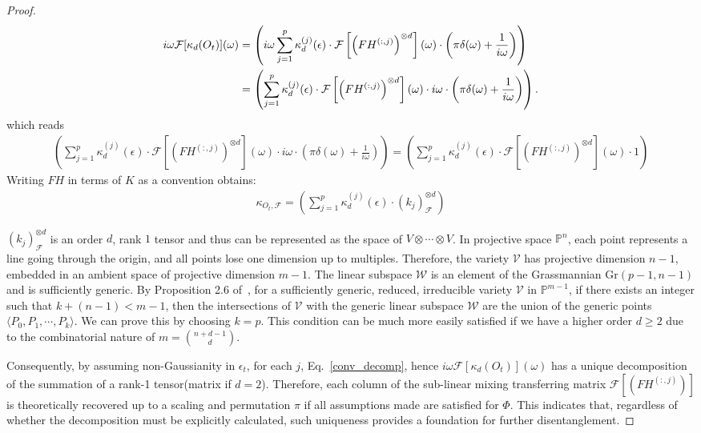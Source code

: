 \documentclass[10pt]{article}
\numberwithin{figure}{section}
\begin{document}
\begin{proof}
\begin{align}
     i\omega \mathcal{F}[\kappa_d(O_t)](\omega) 
&= \left( i\omega\sum_{j=1}^p \kappa_d^{(j)}(\epsilon) \cdot \mathcal{F}\left[ \left( F H^{(:,j)} \right)^{\otimes d} \right](\omega) \cdot \left( \pi \delta(\omega) + \frac{1}{i \omega} \right)\right) \notag\\
&= \left( \sum_{j=1}^p \kappa_d^{(j)}(\epsilon) \cdot \mathcal{F}\left[ \left( F H^{(:,j)} \right)^{\otimes d} \right](\omega) \cdot i\omega\cdot \left( \pi \delta(\omega) + \frac{1}{i \omega} \right)\right).\notag
\end{align}
which reads
\begin{align}
    \left( \sum_{j=1}^p \kappa_d^{(j)}(\epsilon) \cdot \mathcal{F}\left[ \left( F H^{(:,j)} \right)^{\otimes d} \right](\omega) \cdot i\omega\cdot \left( \pi \delta(\omega) + \frac{1}{i \omega} \right)\right)=\left( \sum_{j=1}^p \kappa_d^{(j)}(\epsilon) \cdot \mathcal{F}\left[ \left( F H^{(:,j)} \right)^{\otimes d} \right](\omega)\cdot 1\right)\label{conv_decomp}
\end{align}
Writing $FH$ in terms of $K$ as a convention obtains:
\begin{align*}
    \kappa_{O_t,\mathcal{F}} = \left( \sum_{j=1}^p \kappa_d^{(j)}(\epsilon) \cdot  \left( k_j \right)_{\mathcal{F}}^{\otimes d}\right)
\end{align*}

$\left( k_j \right)_{\mathcal{F}}^{\otimes d}$ is an order $d$, rank $1$ tensor and thus can be represented as the space of $V\otimes\cdots\otimes V$. 
In projective space $\mathbb{P}^n$, each point represents a line going through the origin, and all points lose one dimension up to multiples. Therefore, the variety $\mathcal{V}$ has projective dimension $n-1$, embedded in an ambient space of projective dimension $m-1$.   The linear subspace $\mathcal{W}$ is an element of the Grassmannian $\mathrm{Gr}(p-1,n-1)$ and is sufficiently generic.  By Proposition 2.6 of~\citep{chiantini2002weakly}, for a sufficiently generic, reduced, irreducible variety $\mathcal{V}$ in $\mathbb{P}^{m-1}$, if there exists an integer such that $k+(n-1) < m-1$, then the intersections of $\mathcal{V}$ with the generic linear subspace $\mathcal{W}$ are the union of the generic points $\langle P_0, P_1,\cdots,P_k\rangle$. We can prove this by choosing $k=p$.  This condition can be much more easily satisfied if we have a higher order $d\ge 2$ due to the combinatorial nature of $m= \binom{n+d-1}{d}$.

Consequently, by assuming non-Gaussianity in $\epsilon_t$, for each $j$, Eq.~\eqref{conv_decomp}, hence $i\omega \mathcal{F}[\kappa_d(O_t)](\omega) $  has a unique decomposition of the summation of a rank-1 tensor(matrix if $d=2$). Therefore, each column of the sub-linear mixing transferring matrix \(\mathcal{F}\left[ \left( F H^{(:,j)} \right) \right]\) is theoretically recovered up to a scaling and permutation \( \pi \) if all assumptions made are satisfied for $\Phi$. This indicates that, regardless of whether the decomposition must be explicitly calculated, such uniqueness provides a foundation for further disentanglement. 
\end{proof}
\end{document}
